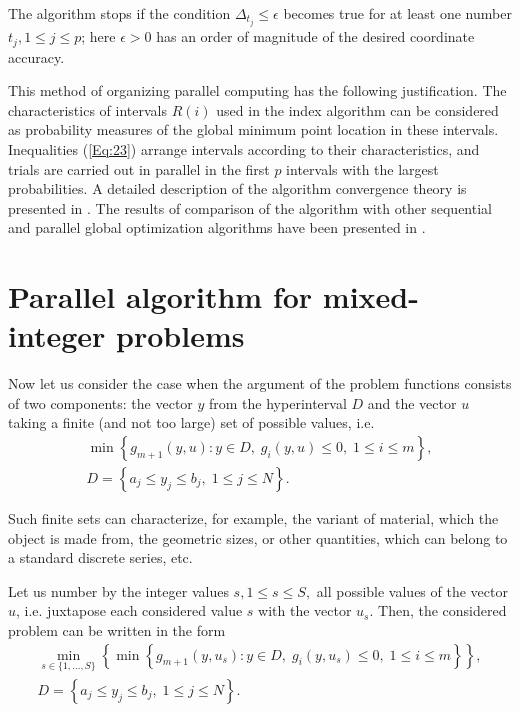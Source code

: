 \documentclass[runningheads]{llncs}
\begin{document}
The algorithm stops if the condition $\Delta_{t_j}\leq \epsilon$ becomes true for at least one
number $t_j, 1\leq j \leq p$; here  $\epsilon>0$ has an order of magnitude of the desired
coordinate accuracy.

This method of organizing parallel computing has the following justification.
The characteristics of intervals $R(i)$ used in the index algorithm can be considered as
probability measures of the global minimum point location in these intervals. Inequalities
(\ref{Eq:23}) arrange intervals according to their characteristics, and trials are carried out in parallel in
the first $p$ intervals with the largest probabilities.
A detailed description of the algorithm convergence theory is presented in \cite{Strongin2000}.
The results of comparison of the algorithm with other sequential and parallel global optimization algorithms have been presented in \cite{Sovrasov2019}.

\section{Parallel algorithm for mixed-integer problems}
Now let us consider the case when the argument of the problem functions consists of two
components: the vector $y$ from the hyperinterval $D$ and the vector $u$ taking a finite
(and not too large) set of possible values, i.e.
\begin{gather}\label{problem_i}
\min{\left\{ g_{m+1}(y,u):y\in D, \; g_i(y,u)\leq 0, \; 1 \leq i \leq m\right\}},\\
D=\left\{a_j\leq y_j \leq b_j, \; 1\leq j \leq N \right\}.\nonumber
\end{gather}

Such finite sets can characterize, for example, the variant of material, which the object is made
from, the geometric sizes, or other quantities, which can belong to a standard discrete series, etc.

Let us number by the integer values $s, 1\leq s \leq S,$ all possible values of the vector $u$, i.e.
juxtapose each considered value $s$ with the vector $u_s$.
Then, the considered problem can be written in the form
\begin{gather}\label{problem_is}
 \min_{s\in\{1,...,S\}} \left\{ \min_{}{\left\{ g_{m+1}(y,u_s):y\in D, \; g_i(y,u_s)\leq 0, \; 1 \leq i \leq
m\right\}}\right\},\\
D=\left\{ a_j\leq y_j \leq b_j, \; 1 \leq j\leq N \right\}.\nonumber
\end{gather}
\end{document}
